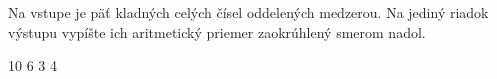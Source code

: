 




Na vstupe je päť kladných celých čísel oddelených medzerou. Na jediný riadok výstupu vypíšte ich
aritmetický priemer zaokrúhlený smerom nadol. 

 10 6 3 4
\koniec



